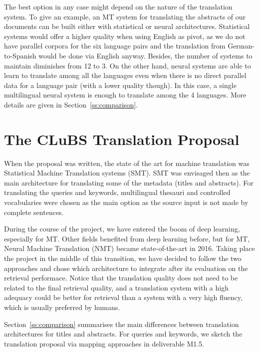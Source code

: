 \documentclass[a4paper,11pt]{article}
\begin{document}
The best option in any case might depend on the nature of the translation system. To give an example, an MT system for translating the abstracts of our documents can be built either with statistical or neural architectures. Statistical systems would offer a higher quality when using English as pivot, as we do not have parallel corpora for the six language pairs and the translation from German-to-Spanish would be done via English anyway. Besides, the number of systems to maintain diminishes from 12 to 3.
On the other hand, neural systems are able to learn to translate among all the languages even when there is no direct parallel data for a language pair (with a lower quality though). In this case, a single multilingual neural system is enough to translate among the 4 languages. More details are given in Section~\ref{ss:comparison}.



\section{The CLuBS Translation Proposal}
\label{s:proposal}

When the proposal was written, the state of the art for machine translation was Statistical Machine Translation systems (SMT). SMT was envisaged then as the main architecture for translating some of the metadata (titles and abstracts). For translating the queries and keywords, multilingual thesauri and controlled vocabularies were chosen as the main option as the source input is not made by complete sentences.

During the course of the project, we have entered the boom of deep learning, especially for MT. Other fields benefited from deep learning before, but for MT, Neural Machine Translation (NMT) became state-of-the-art in 2016. Taking place the project in the middle of this transition, we have decided to follow the two approaches and chose which architecture to integrate after its evaluation on the retrieval performace. Notice that the translation quality does not need to be related to the final retrieval quality, and a translation system with a high adequacy could be better for retrieval than a system with a very high fluency, which is usually preferred by humans.

Section~\ref{ss:comparison} summarises the main differences between translation architectures for titles and abstracts. For queries and keywords, we sketch the translation proposal  via mapping approaches in deliverable M1.5.
\end{document}
